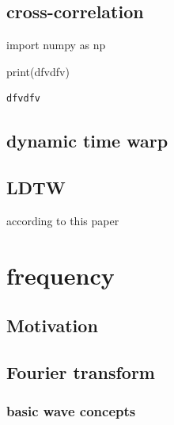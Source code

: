 \documentclass[
  letterpaper,
  DIV=11,
  numbers=noendperiod,
  oneside]{scrreprt}
\newenvironment{Shaded}{\begin{snugshade}}{\end{snugshade}}
\newcommand{\BuiltInTok}[1]{\textcolor[rgb]{0.00,0.23,0.31}{#1}}
\newcommand{\ImportTok}[1]{\textcolor[rgb]{0.00,0.46,0.62}{#1}}
\newcommand{\NormalTok}[1]{\textcolor[rgb]{0.00,0.23,0.31}{#1}}
\newcommand{\StringTok}[1]{\textcolor[rgb]{0.13,0.47,0.30}{#1}}
\begin{document}
\hypertarget{cross-correlation}{%
\chapter{cross-correlation}\label{cross-correlation}}

\begin{Shaded}
\begin{Highlighting}[]
\ImportTok{import}\NormalTok{ numpy }\ImportTok{as}\NormalTok{ np}
\end{Highlighting}
\end{Shaded}

\begin{Shaded}
\begin{Highlighting}[]
\BuiltInTok{print}\NormalTok{(}\StringTok{\textquotesingle{}dfvdfv\textquotesingle{}}\NormalTok{)}
\end{Highlighting}
\end{Shaded}

\begin{verbatim}
dfvdfv
\end{verbatim}

\hypertarget{dynamic-time-warp}{%
\chapter{dynamic time warp}\label{dynamic-time-warp}}

\hypertarget{ldtw}{%
\chapter{LDTW}\label{ldtw}}

according to this paper

\part{frequency}

\hypertarget{motivation-6}{%
\chapter{Motivation}\label{motivation-6}}

\hypertarget{fourier-transform}{%
\chapter{Fourier transform}\label{fourier-transform}}

\hypertarget{basic-wave-concepts}{%
\section{basic wave concepts}\label{basic-wave-concepts}}
\end{document}
